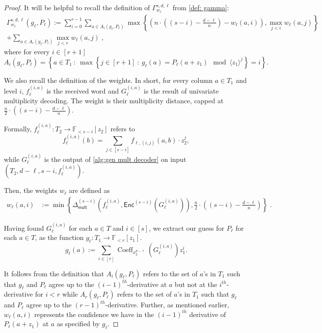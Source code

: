 \documentclass{article}
\def\Field{\mathbb{F}}
\let\F\Field
\def\inbrace#1{\left\{ #1 \right\}}
\def\setdef#1#2{\inbrace{ #1 \ \colon \ #2}}      %
\newcommand{\enc}{{\mathsf{Enc}}}
\newcommand{\coeff}{\operatorname{Coeff}}
\newcommand{\Delm}{\Delta_{\mathsf{mult}}}
\begin{document}
	\begin{proof}	
		It will be helpful to recall the definition of $\Gamma_{w_\ell}^{s, d, \ell}$ from \cref{def: gamma}:
		\begin{multline*}
		\Gamma_{w_\ell}^{s, d, \ell}\left(g_\ell, P_\ell\right)  := \sum_{i = 0}^{r-1} \sum_{a
			\in A_i\left(g_\ell, P_\ell\right)} \max
		\left\{\left(n\cdot \left(\left(s-i\right) -
		\frac{d-\ell}n\right) - w_\ell\left(a,i\right)\right),
		\max_{j < i} w_\ell(a, j) \right\}\\
		+ \sum_{a \in A_r\left(g_\ell,
			P_\ell\right)} \max_{j < r} w_\ell(a,
		j)\;, 
        \end{multline*}
		where for every $i \in [r+1]$
		\[
		A_i\left(g_\ell,P_\ell\right)=\setdef{a\in T_1}{\max{\setdef{j\in [r+1]}{g_\ell(a)=P_\ell(a+z_1) \mod \langle z_1\rangle^{j}}}=i}.
		\]
		
		We also recall the definition of the weights. In short, for every column $a \in T_1$ and level $i$, $f_{\ell}^{\left(i, a\right)}$ is the received word and $G_\ell^{(i,a)}$ is the result of univariate multiplicity decoding. The weight is their multiplicity distance, capped at $\frac{n}2\cdot((s-i)-\frac{d-\ell}n)$.
		
		Formally, $f_\ell^{(i,a)}\colon T_2 \to \F_{< s-i}[z_2]$ refers to 
		\[f_{\ell}^{\left(i, a\right)} \left(b\right) = \sum_{j \in
			[s-i]} f_{\ell, \left(i, j\right)}\left(a, b\right)
		\cdot z_2^{j},\]
		while $G_\ell^{(i,a)}$ is the output of \cref{alg:gen mult decoder} on
		input $\left(T_2,  d-\ell, s-i, f_{\ell}^{\left(i,
			a\right)}\right)$.
		
		Then, the weights $w_\ell$ are defined as
		\begin{align*}
			w_\ell(a,i) &:= \min
			\left\{\Delm^{\left(s-i\right)}\left(f_\ell^{\left(i,
				a\right)} , \enc^{(s-i)}\left(G_\ell^{\left(i, a\right)}\right) \right), \frac{n}2\cdot\left((s-i)-\frac{d-\ell}n\right)\right\}\;.
		\end{align*}    
		
		Having found $G_\ell^{(i,a)}$ for each $a \in T$ and $i \in [s]$, we extract our guess for $P_{\ell}$ for each $a \in T$, as the function $g_\ell \colon T_1 \to \F_{<r}[z_1]$.
		\[g_\ell\left(a\right) := \sum_{i \in [r]}
		\coeff_{x_2^{d-\ell}}\left(G_{\ell}^{\left(i,
			a\right)}\right)z_1^{i}.\]
		
		It follows from the definition that $A_i\left(g_\ell,P_\ell\right)$
		refers to the set of $a$'s in $T_1$ such that $g_\ell$ and $P_\ell$
		agree up to the $(i-1)^{th}$-derivative at $a$ but not at the
		$i^{th}$-derivative for $i <r$ while $A_r\left(g_\ell,P_\ell\right)$
		refers to the set of $a$'s in $T_1$ such that $g_\ell$ and $P_\ell$
		agree up to the $(r-1)^{th}$-derivative. Further, as mentioned earlier, $w_\ell(a,i)$ represents the confidence we have in the $(i-1)^{th}$ derivative of $P_\ell(a+z_1)$ at $a$ as specified by $g_\ell$.
		

\end{proof}
\end{document}
